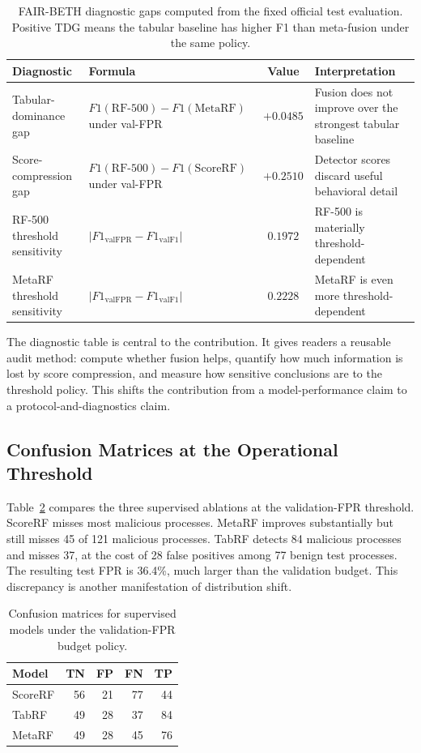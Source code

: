 \documentclass[journal]{IEEEtran}
\begin{document}
\begin{table}[t]
\centering
\caption{FAIR-BETH diagnostic gaps computed from the fixed official test evaluation. Positive TDG means the tabular baseline has higher F1 than meta-fusion under the same policy.}
\label{tab:diagnostics}
\small
\begin{tabular}{p{3.2cm}p{5.0cm}cp{5.2cm}}
\toprule
\textbf{Diagnostic} & \textbf{Formula} & \textbf{Value} & \textbf{Interpretation} \\
\midrule
Tabular-dominance gap & $F1(\mathrm{RF\text{-}500})-F1(\mathrm{MetaRF})$ under val-FPR & $+0.0485$ & Fusion does not improve over the strongest tabular baseline \\
Score-compression gap & $F1(\mathrm{RF\text{-}500})-F1(\mathrm{ScoreRF})$ under val-FPR & $+0.2510$ & Detector scores discard useful behavioral detail \\
RF-500 threshold sensitivity & $|F1_{\mathrm{valFPR}}-F1_{\mathrm{valF1}}|$ & $0.1972$ & RF-500 is materially threshold-dependent \\
MetaRF threshold sensitivity & $|F1_{\mathrm{valFPR}}-F1_{\mathrm{valF1}}|$ & $0.2228$ & MetaRF is even more threshold-dependent \\
\bottomrule
\end{tabular}
\end{table}

The diagnostic table is central to the contribution. It gives readers a reusable audit method: compute whether fusion helps, quantify how much information is lost by score compression, and measure how sensitive conclusions are to the threshold policy. This shifts the contribution from a model-performance claim to a protocol-and-diagnostics claim.

\subsection{Confusion Matrices at the Operational Threshold}

Table~\ref{tab:cm_budget} compares the three supervised ablations at the validation-FPR threshold. ScoreRF misses most malicious processes. MetaRF improves substantially but still misses 45 of 121 malicious processes. TabRF detects 84 malicious processes and misses 37, at the cost of 28 false positives among 77 benign test processes. The resulting test FPR is 36.4\%, much larger than the validation budget. This discrepancy is another manifestation of distribution shift.

\begin{table}[t]
\centering
\caption{Confusion matrices for supervised models under the validation-FPR budget policy.}
\label{tab:cm_budget}
\begin{tabular}{lrrrr}
\toprule
\textbf{Model} & \textbf{TN} & \textbf{FP} & \textbf{FN} & \textbf{TP} \\
\midrule
ScoreRF & 56 & 21 & 77 & 44 \\
TabRF & 49 & 28 & 37 & 84 \\
MetaRF & 49 & 28 & 45 & 76 \\
\bottomrule
\end{tabular}
\end{table}
\end{document}
